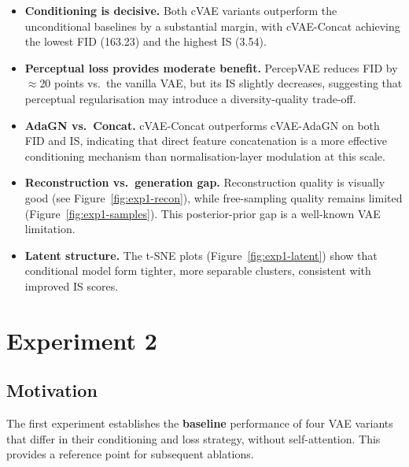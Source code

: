 \documentclass[12pt, a4paper]{article}
\begin{document}
\begin{itemize}
    \item \textbf{Conditioning is decisive.} Both cVAE variants
          outperform the unconditional baselines by a substantial margin,
          with cVAE-Concat achieving the lowest FID (163.23) and the
          highest IS (3.54).

    \item \textbf{Perceptual loss provides moderate benefit.}
          PercepVAE reduces FID by $\approx$20 points vs.\ the vanilla
          VAE, but its IS slightly decreases, suggesting that perceptual
          regularisation may introduce a diversity-quality trade-off.

    \item \textbf{AdaGN vs.\ Concat.} cVAE-Concat outperforms
          cVAE-AdaGN on both FID and IS, indicating that direct feature
          concatenation is a more effective conditioning mechanism than
          normalisation-layer modulation at this scale.

    \item \textbf{Reconstruction vs.\ generation gap.}
          Reconstruction quality is visually good (see
          Figure~\ref{fig:exp1-recon}), while free-sampling quality
          remains limited (Figure~\ref{fig:exp1-samples}). This
          posterior-prior gap is a well-known VAE limitation.

    \item \textbf{Latent structure.} The t-SNE plots
          (Figure~\ref{fig:exp1-latent}) show that conditional model
          form tighter, more separable clusters, consistent with
          improved IS scores.
\end{itemize}



\section{Experiment 2}
\label{sec:exp1}

\subsection{Motivation}
\label{subsec:exp1-motivation}

The first experiment establishes the \textbf{baseline} performance of
four VAE variants that differ in their conditioning and loss strategy,
without self-attention. This provides a reference point for subsequent
ablations.
\end{document}

